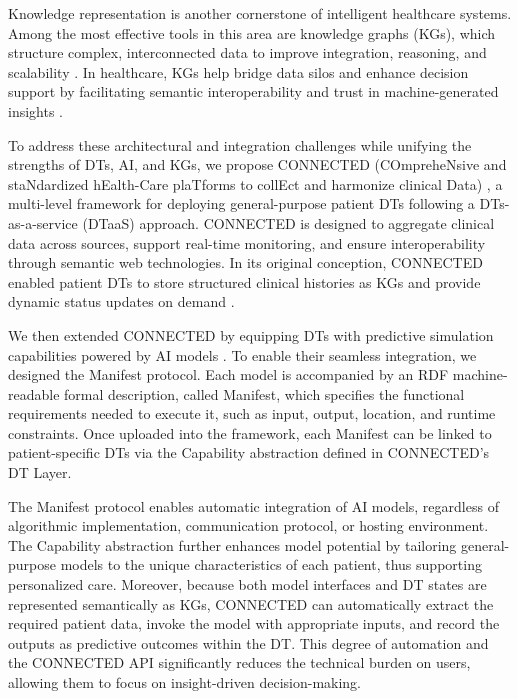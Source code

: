 Knowledge representation is another cornerstone of intelligent healthcare systems. Among the most effective tools in this area are knowledge graphs (KGs), which structure complex, interconnected data to improve integration, reasoning, and scalability \cite{peng_knowledge_2023}. In healthcare, KGs help bridge data silos and enhance decision support by facilitating semantic interoperability and trust in machine-generated insights \cite{peng_knowledge_2023,abu-salih_healthcare_2023}.

To address these architectural and integration challenges while unifying the strengths of DTs, AI, and KGs, we propose CONNECTED (COmpreheNsive and staNdardized hEalth-Care plaTforms to collEct and harmonize clinical Data) \cite{10.3389/fdgth.2023.1322428_carbonaro_connected}, a multi-level framework for deploying general-purpose patient DTs following a DTs-as-a-service (DTaaS) approach. CONNECTED is designed to aggregate clinical data across sources, support real-time monitoring, and ensure interoperability through semantic web technologies. In its original conception, CONNECTED enabled patient DTs to store structured clinical histories as KGs and provide dynamic status updates on demand \cite{10.3389/fdgth.2023.1322428_carbonaro_connected}.

We then extended CONNECTED by equipping DTs with predictive simulation capabilities powered by AI models \cite{marfoglia_2024_mimo}. To enable their seamless integration, we designed the Manifest protocol. Each model is accompanied by an RDF machine-readable formal description, called  Manifest, which specifies the functional requirements needed to execute it, such as input, output, location, and runtime constraints. Once uploaded into the framework, each Manifest can be linked to patient-specific DTs via the Capability abstraction defined in CONNECTED's DT Layer.

The Manifest protocol enables automatic integration of AI models, regardless of algorithmic implementation, communication protocol, or hosting environment. The Capability abstraction further enhances model potential by tailoring general-purpose models to the unique characteristics of each patient, thus supporting personalized care. Moreover, because both model interfaces and DT states are represented semantically as KGs, CONNECTED can automatically extract the required patient data, invoke the model with appropriate inputs, and record the outputs as predictive outcomes within the DT. This degree of automation and the CONNECTED API significantly reduces the technical burden on users, allowing them to focus on insight-driven decision-making.

